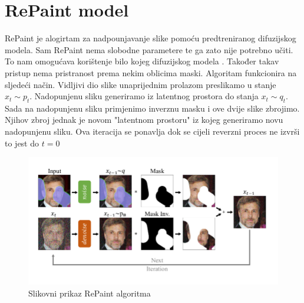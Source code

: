 \documentclass[10pt, a4paper, croatian]{article}
\begin{document}
\section{RePaint model}
RePaint je alogirtam za nadpounjavanje slike pomoću predtreniranog difuzijskog modela. Sam RePaint nema slobodne parametere te ga zato nije
potrebno učiti. To nam omogućava korištenje bilo kojeg difuzijskog modela \cite{repaint}. Također takav pristup nema pristranost prema nekim oblicima maski.
Algoritam funkcionira na sljedeći način. Vidljivi dio slike unaprijednim prolazom preslikamo u stanje $x_t \sim p_t$. Nadopunjenu sliku 
generiramo iz latentnog prostora do stanja $x_t \sim q_t$. Sada na nadopunjenu sliku primjenimo inverznu masku i ove dvije slike zbrojimo. 
Njihov zbroj jednak je novom "latentnom prostoru" iz kojeg generiramo novu nadopunjenu sliku. Ova iteracija se ponavlja dok se cijeli reverzni
proces ne izvrši to jest do $t = 0$
\begin{figure}
	\begin{center}
	\includegraphics[width=\columnwidth]{images/repaint.png}
	\caption{Slikovni prikaz RePaint algoritma \cite{repaint}}
	\label{fig:figure2}
	\end{center}
\end{figure}
\end{document}
